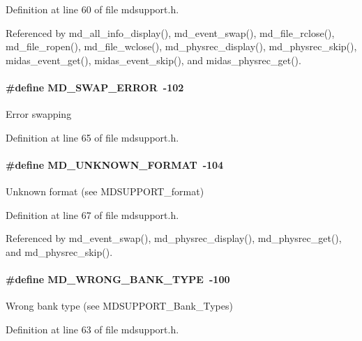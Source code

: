 Definition at line 60 of file mdsupport.h.

Referenced by md\_\-all\_\-info\_\-display(), md\_\-event\_\-swap(), md\_\-file\_\-rclose(), md\_\-file\_\-ropen(), md\_\-file\_\-wclose(), md\_\-physrec\_\-display(), md\_\-physrec\_\-skip(), midas\_\-event\_\-get(), midas\_\-event\_\-skip(), and midas\_\-physrec\_\-get().
\paragraph[{MD\_\-SWAP\_\-ERROR}]{\setlength{\rightskip}{0pt plus 5cm}\#define MD\_\-SWAP\_\-ERROR~-\/102}\hfill\label{group__mdsupporterrorh_gaff1a819016cbf8084d88e0f78e548b60}
Error swapping 

Definition at line 65 of file mdsupport.h.
\paragraph[{MD\_\-UNKNOWN\_\-FORMAT}]{\setlength{\rightskip}{0pt plus 5cm}\#define MD\_\-UNKNOWN\_\-FORMAT~-\/104}\hfill\label{group__mdsupporterrorh_gae2f17985734efbefedfd5956b4e4a0f8}
Unknown format (see MDSUPPORT\_\-format) 

Definition at line 67 of file mdsupport.h.

Referenced by md\_\-event\_\-swap(), md\_\-physrec\_\-display(), md\_\-physrec\_\-get(), and md\_\-physrec\_\-skip().
\paragraph[{MD\_\-WRONG\_\-BANK\_\-TYPE}]{\setlength{\rightskip}{0pt plus 5cm}\#define MD\_\-WRONG\_\-BANK\_\-TYPE~-\/100}\hfill\label{group__mdsupporterrorh_ga272861cd4d9ff8e05d3f2aafc4489f10}
Wrong bank type (see MDSUPPORT\_\-Bank\_\-Types) 

Definition at line 63 of file mdsupport.h.